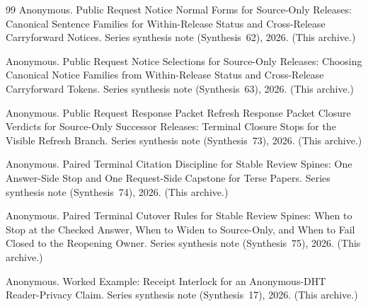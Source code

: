 \documentclass[11pt]{article}
\begin{document}
\begin{thebibliography}{99}
Anonymous.
\newblock Public Request Notice Normal Forms for Source-Only Releases: Canonical Sentence Families for Within-Release Status and Cross-Release Carryforward Notices.
\newblock Series synthesis note (Synthesis~62), 2026. (This archive.)

Anonymous.
\newblock Public Request Notice Selections for Source-Only Releases: Choosing Canonical Notice Families from Within-Release Status and Cross-Release Carryforward Tokens.
\newblock Series synthesis note (Synthesis~63), 2026. (This archive.)

Anonymous.
\newblock Public Request Response Packet Refresh Response Packet Closure Verdicts for Source-Only Successor Releases: Terminal Closure Stops for the Visible Refresh Branch.
\newblock Series synthesis note (Synthesis~73), 2026. (This archive.)

Anonymous.
\newblock Paired Terminal Citation Discipline for Stable Review Spines: One Answer-Side Stop and One Request-Side Capstone for Terse Papers.
\newblock Series synthesis note (Synthesis~74), 2026. (This archive.)

Anonymous.
\newblock Paired Terminal Cutover Rules for Stable Review Spines: When to Stop at the Checked Answer, When to Widen to Source-Only, and When to Fail Closed to the Reopening Owner.
\newblock Series synthesis note (Synthesis~75), 2026. (This archive.)

Anonymous.
\newblock Worked Example: Receipt Interlock for an Anonymous-DHT Reader-Privacy Claim.
\newblock Series synthesis note (Synthesis~17), 2026. (This archive.)

\end{thebibliography}
\end{document}
